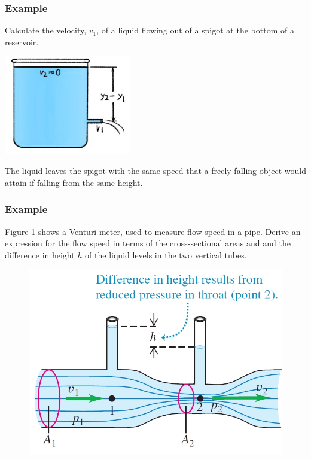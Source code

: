 \documentclass[]{beamer}
\begin{document}



\begin{frame}
  \frametitle{Example \theexamplef }



Calculate the velocity, $v_1$, of a liquid flowing out of a spigot at the bottom of a reservoir.
\vspace{3mm}

  \begin{center}
  \includegraphics[height=1.7in]{images2/Bernoulli2.jpg}
\end{center}
\pause 
\textcolor{mypink1}{The liquid leaves the spigot with the same speed that a
freely falling object would attain if falling from the same height.}
  \end{frame}

 


  \begin{frame}
    \frametitle{Example \theexamplef }
    Figure \ref{venturi} shows a Venturi meter, used to measure flow speed in
    a pipe. Derive an expression for the flow speed in terms of the
    cross-sectional areas and and the difference in height $h$ of
    the liquid levels in the two vertical tubes.

    \begin{figure}[h!]
      \begin{center}
        \includegraphics[height=2.in]{images2/venturi.jpg}
        \label{venturi}
      \end{center}
    \end{figure}

    

    \end{frame}
\end{document}
